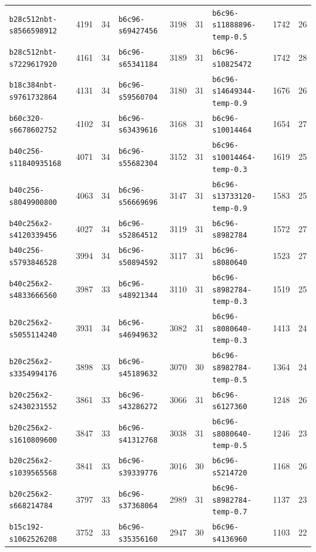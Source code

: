 \documentclass{article}
\begin{document}
\begin{table}[htbp]
\begin{tabular}{@{}lrr@{\hspace{14pt}}lrr@{\hspace{14pt}}lrr@{}}
    \texttt{b28c512nbt-s8566598912} & 4191 & 34 & \texttt{b6c96-s69427456} & 3198 & 31 & \texttt{b6c96-s11888896-temp-0.5} & 1742 & 26 \\
    \texttt{b28c512nbt-s7229617920} & 4161 & 34 & \texttt{b6c96-s65341184} & 3189 & 31 & \texttt{b6c96-s10825472} & 1742 & 28 \\
    \texttt{b18c384nbt-s9761732864} & 4131 & 34 & \texttt{b6c96-s59560704} & 3180 & 31 & \texttt{b6c96-s14649344-temp-0.9} & 1676 & 26 \\
    \texttt{b60c320-s6678602752} & 4102 & 34 & \texttt{b6c96-s63439616} & 3168 & 31 & \texttt{b6c96-s10014464} & 1654 & 27 \\
    \texttt{b40c256-s11840935168} & 4071 & 34 & \texttt{b6c96-s55682304} & 3152 & 31 & \texttt{b6c96-s10014464-temp-0.3} & 1619 & 25 \\
    \texttt{b40c256-s8049900800} & 4063 & 34 & \texttt{b6c96-s56669696} & 3147 & 31 & \texttt{b6c96-s13733120-temp-0.9} & 1583 & 25 \\
    \texttt{b40c256x2-s4120339456} & 4027 & 34 & \texttt{b6c96-s52864512} & 3119 & 31 & \texttt{b6c96-s8982784} & 1572 & 27 \\
    \texttt{b40c256-s5793846528} & 3994 & 34 & \texttt{b6c96-s50894592} & 3117 & 31 & \texttt{b6c96-s8080640} & 1523 & 27 \\
    \texttt{b40c256x2-s4833666560} & 3987 & 33 & \texttt{b6c96-s48921344} & 3110 & 31 & \texttt{b6c96-s8982784-temp-0.3} & 1519 & 25 \\
    \texttt{b20c256x2-s5055114240} & 3931 & 34 & \texttt{b6c96-s46949632} & 3082 & 31 & \texttt{b6c96-s8080640-temp-0.3} & 1413 & 24 \\
    \texttt{b20c256x2-s3354994176} & 3898 & 33 & \texttt{b6c96-s45189632} & 3070 & 30 & \texttt{b6c96-s8982784-temp-0.5} & 1364 & 24 \\
    \texttt{b20c256x2-s2430231552} & 3861 & 33 & \texttt{b6c96-s43286272} & 3066 & 31 & \texttt{b6c96-s6127360} & 1248 & 26 \\
    \texttt{b20c256x2-s1610809600} & 3847 & 33 & \texttt{b6c96-s41312768} & 3038 & 31 & \texttt{b6c96-s8080640-temp-0.5} & 1246 & 23 \\
    \texttt{b20c256x2-s1039565568} & 3841 & 33 & \texttt{b6c96-s39339776} & 3016 & 30 & \texttt{b6c96-s5214720} & 1168 & 26 \\
    \texttt{b20c256x2-s668214784} & 3797 & 33 & \texttt{b6c96-s37368064} & 2989 & 31 & \texttt{b6c96-s8982784-temp-0.7} & 1137 & 23 \\
    \texttt{b15c192-s1062526208} & 3752 & 33 & \texttt{b6c96-s35356160} & 2947 & 30 & \texttt{b6c96-s4136960} & 1103 & 22 \\

\end{tabular}
\end{table}
\end{document}
